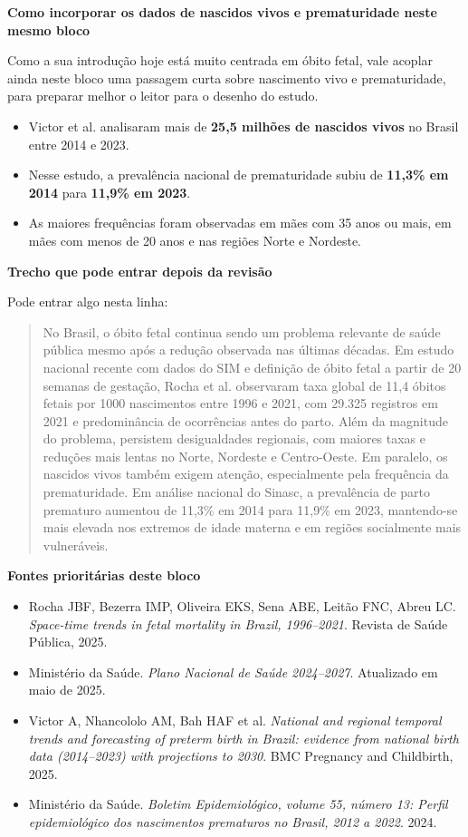\documentclass[12pt,a4paper]{article}
\begin{document}
\textbf{Como incorporar os dados de nascidos vivos e prematuridade neste mesmo bloco}

Como a sua introdução hoje está muito centrada em óbito fetal, vale acoplar ainda neste bloco uma passagem curta sobre nascimento vivo e prematuridade, para preparar melhor o leitor para o desenho do estudo.

\begin{itemize}
\item Victor et al. analisaram mais de \textbf{25,5 milhões de nascidos vivos} no Brasil entre 2014 e 2023.
\item Nesse estudo, a prevalência nacional de prematuridade subiu de \textbf{11,3\% em 2014} para \textbf{11,9\% em 2023}.
\item As maiores frequências foram observadas em mães com 35 anos ou mais, em mães com menos de 20 anos e nas regiões Norte e Nordeste.
\end{itemize}

\textbf{Trecho que pode entrar depois da revisão}

Pode entrar algo nesta linha:

\begin{quote}
No Brasil, o óbito fetal continua sendo um problema relevante de saúde pública mesmo após a redução observada nas últimas décadas. Em estudo nacional recente com dados do SIM e definição de óbito fetal a partir de 20 semanas de gestação, Rocha et al. observaram taxa global de 11,4 óbitos fetais por 1000 nascimentos entre 1996 e 2021, com 29.325 registros em 2021 e predominância de ocorrências antes do parto. Além da magnitude do problema, persistem desigualdades regionais, com maiores taxas e reduções mais lentas no Norte, Nordeste e Centro-Oeste. Em paralelo, os nascidos vivos também exigem atenção, especialmente pela frequência da prematuridade. Em análise nacional do Sinasc, a prevalência de parto prematuro aumentou de 11,3\% em 2014 para 11,9\% em 2023, mantendo-se mais elevada nos extremos de idade materna e em regiões socialmente mais vulneráveis.
\end{quote}

\textbf{Fontes prioritárias deste bloco}

\begin{itemize}
\item Rocha JBF, Bezerra IMP, Oliveira EKS, Sena ABE, Leitão FNC, Abreu LC. \textit{Space-time trends in fetal mortality in Brazil, 1996--2021}. Revista de Saúde Pública, 2025.
\item Ministério da Saúde. \textit{Plano Nacional de Saúde 2024--2027}. Atualizado em maio de 2025.
\item Victor A, Nhancololo AM, Bah HAF et al. \textit{National and regional temporal trends and forecasting of preterm birth in Brazil: evidence from national birth data (2014--2023) with projections to 2030}. BMC Pregnancy and Childbirth, 2025.
\item Ministério da Saúde. \textit{Boletim Epidemiológico, volume 55, número 13: Perfil epidemiológico dos nascimentos prematuros no Brasil, 2012 a 2022}. 2024.
\end{itemize}
\end{document}
